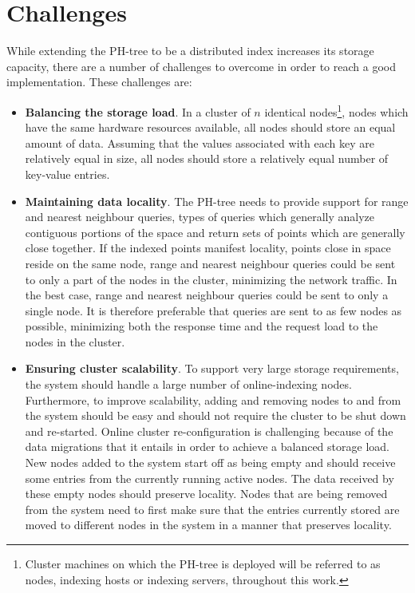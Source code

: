 \documentclass[11pt,a4paper]{globis-book}
\begin{document}
\section{Challenges}
\label{sec:distindex-challenges}

While extending the PH-tree to be a distributed index increases its storage capacity, there are a number of challenges to overcome in order to reach a good implementation. These challenges are:
\begin{itemize}
    \item \textbf{Balancing the storage load}. In a cluster of $n$ identical nodes\footnote{Cluster machines on which the PH-tree is deployed will be referred to as nodes, indexing hosts or indexing servers, throughout this work.}, nodes which have the same hardware resources available, all nodes should store an equal amount of data. Assuming that the values associated with each key are relatively equal in size, all nodes should store a relatively equal number of key-value entries.
    \item \textbf{Maintaining data locality}. The PH-tree needs to provide support for range and nearest neighbour queries, types of queries which generally analyze contiguous portions of the space and return sets of points which are generally close together. If the indexed points manifest locality, points close in space reside on the same node, range and nearest neighbour queries could be sent to only a part of the nodes in the cluster, minimizing the network traffic. In the best case, range and nearest neighbour queries could be sent to only a single node. It is therefore preferable that queries are sent to as few nodes as possible, minimizing both the response time and the request load to the nodes in the cluster.
    \item \textbf{Ensuring cluster scalability}. To support very large storage requirements, the system should handle a large number of online-indexing nodes. Furthermore, to improve scalability, adding and removing nodes to and from the system should be easy and should not require the cluster to be shut down and re-started. Online cluster re-configuration is challenging because of the data migrations that it entails in order to achieve a balanced storage load. New nodes added to the system start off as being empty and should receive some entries from the currently running active nodes. The data received by these empty nodes should preserve locality. Nodes that are being removed from the system need to first make sure that the entries currently stored are moved to different nodes in the system in a manner that preserves locality. 

\end{itemize}
\end{document}
